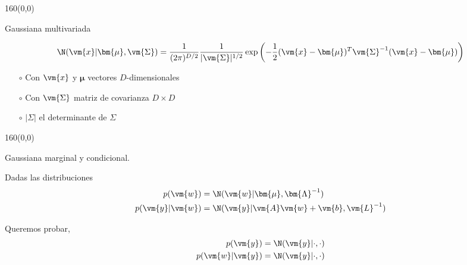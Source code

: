 \documentclass[shownotes,aspectratio=169]{beamer}
\begin{document}
 \begin{frame}[plain]
 \begin{textblock}{160}(0,0)
\begin{center}
 \Large Gaussiana multivariada
\end{center}
\end{textblock}


\begin{align*}
\N(\vm{x}|\bm{\mu},\vm{\Sigma}) = \frac{1}{(2\pi)^{D/2}} \frac{1}{|\vm{\Sigma}|^{1/2}} \exp\left( - \frac{1}{2} (\vm{x}-\bm{\mu})^T \vm{\Sigma}^{-1} (\vm{x}-\bm{\mu}) \right)
\end{align*}

\vspace{0.5cm}

\begin{itemize}
 \item[$\circ$] Con $\vm{x}$ y $\bm{\mu}$ vectores $D$-dimensionales
 \item[$\circ$] Con $\vm{\Sigma}$ matriz de covarianza $D \times D$
 \item[$\circ$] $|\Sigma|$ el determinante de $\Sigma$
\end{itemize}

 \end{frame}
 
\begin{frame}[plain]
 \begin{textblock}{160}(0,0)
\begin{center}
 \Large Gaussiana marginal y condicional.
\end{center}
\end{textblock}


Dadas las distribuciones
\begin{align*}
    p(\vm{w}) &=  \N(\vm{w}|\bm{\mu},\bm{\Lambda}^{-1}) \\
   p(\vm{y}|\vm{w}) &=  \N(\vm{y}|\vm{A}\vm{w}+\vm{b},\vm{L}^{-1})    
\end{align*}


Queremos probar,  
\begin{align*}
    p(\vm{y}) &=  \N(\vm{y}|\cdot,\cdot) \\ %
   p(\vm{w}|\vm{y}) &=  \N(\vm{y}|\cdot,\cdot) %
\end{align*}
% 

\end{frame}
\end{document}
